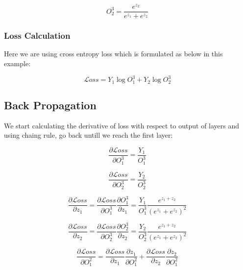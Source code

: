 \documentclass{article}
\newcommand{\loss}{\mathcal{L}oss}
\begin{document}
\begin{equation*}
    O_{2}^{3} = \frac{e^{z_{2}}}{e^{z_{1}} + e^{z_{2}}}
\end{equation*}

\subsubsection*{Loss Calculation}
Here we are using cross entropy loss which is formulated as below in this example:

\begin{equation*}
    \mathcal{L}oss = Y_{1}\log{O_{1}^{3}} + Y_{2}\log{O_{2}^{3}}
\end{equation*}

\subsection*{Back Propagation}
We start calculating the derivative of loss with respect to output of layers and using chaing rule, go back untill we reach the first layer:

\begin{equation}
    \frac{\partial{\loss}}{\partial{O_{1}^{3}}} = \frac{Y_{1}}{O_{1}^{3}}
\end{equation}
    
\begin{equation}
    \frac{\partial{\loss}}{\partial{O_{2}^{3}}} = \frac{Y_{2}}{O_{2}^{3}}
\end{equation}

\begin{equation}
    \frac{\partial{\loss}}{\partial{z_{1}}} = \frac{\partial{\loss}}{\partial{O_{1}^{3}}}\frac{\partial{O_{1}^{3}}}{\partial{z_{1}}} = \frac{Y_{1}}{O_{1}^{3}}
    \frac{e^{z_{1} + z_{2}}}{(e^{z_{1}} + e^{z_{2}})^2}
\end{equation}
    
\begin{equation}
    \frac{\partial{\loss}}{\partial{z_{2}}} = \frac{\partial{\loss}}{\partial{O_{2}^{3}}}\frac{\partial{O_{2}^{3}}}{\partial{z_{2}}} = \frac{Y_{2}}{O_{2}^{3}}
    \frac{e^{z_{1} + z_{2}}}{(e^{z_{1}} + e^{z_{2}})^2}
\end{equation}

\begin{equation*}
    \frac{\partial{\loss}}{\partial{O_{1}^{2}}} = \frac{\partial{\loss}}{\partial{z_{1}}}\frac{\partial{z_{1}}}{\partial{O_{1}^{2}}}
    + \frac{\partial{\loss}}{\partial{z_{2}}}\frac{\partial{z_{2}}}{\partial{O_{1}^{2}}}
\end{equation*}
\end{document}
